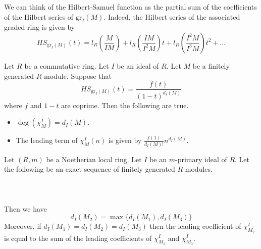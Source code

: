 \documentclass[a4paper]{article}
\begin{document}
We can think of the Hilbert-Samuel function as the partial sum of the coefficients of the Hilbert series of $\text{gr}_I(M)$. Indeed, the Hilbert series of the associated graded ring is given by $$HS_{\text{gr}_I(M)}(t)=l_R\left(\frac{M}{IM}\right)+l_R\left(\frac{IM}{I^2M}\right)t+l_R\left(\frac{I^2M}{I^3M}\right)t^2+\dots$$

\begin{prp}{}{} Let $R$ be a commutative ring. Let $I$ be an ideal of $R$. Let $M$ be a finitely generated $R$-module. Suppose that $$HS_{\text{gr}_I(M)}(t)=\frac{f(t)}{(1-t)^{d_I(M)}}$$ where $f$ and $1-t$ are coprime. Then the following are true. 
\begin{itemize}
\item $\deg(\chi_M^I)=d_I(M)$. 
\item The leading term of $\chi_M^I(n)$ is given by $\frac{f(1)}{d_I(M)!}n^{d_I(M)}$. 
\end{itemize}
\end{prp}

\begin{prp}{}{} Let $(R,m)$ be a Noetherian local ring. Let $I$ be an $m$-primary ideal of $R$. Let the following be an exact sequence of finitely generated $R$-modules. \\~\\
\\~\\
Then we have $$d_I(M_2)=\max\{d_I(M_1),d_I(M_3)\}$$ Moreover, if $d_I(M_1)=d_I(M_2)=d_I(M_3)$ then the leading coefficient of $\chi_{M_2}^I$ is equal to the sum of the leading coefficients of $\chi_{M_1}^I$ and $\chi_{M_3}^I$. 
\end{prp}
\end{document}
